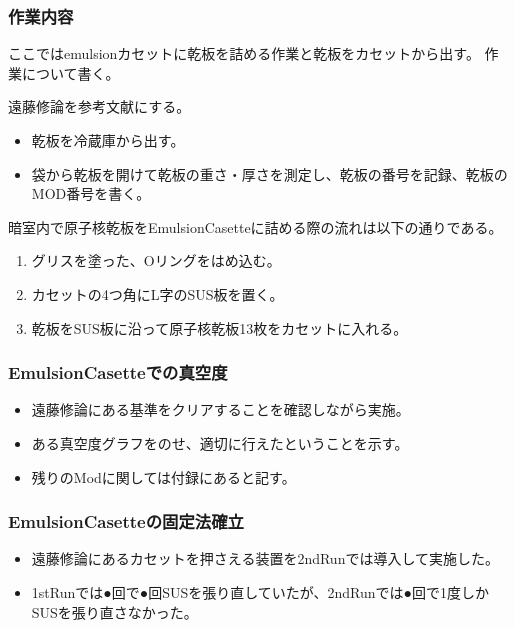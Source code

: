 \documentclass[12pt,a4paper]{jarticle}
\begin{document}
\subsubsection{作業内容}
ここではemulsionカセットに乾板を詰める作業と乾板をカセットから出す。
作業について書く。
\par
遠藤修論を参考文献にする。
\begin{itemize}
 \item 乾板を冷蔵庫から出す。
 \item 袋から乾板を開けて乾板の重さ・厚さを測定し、乾板の番号を記録、乾板のMOD番号を書く。
\end{itemize}
暗室内で原子核乾板をEmulsionCasetteに詰める際の流れは以下の通りである。
\begin{enumerate}
    \item グリスを塗った、Oリングをはめ込む。
    \item カセットの4つ角にL字のSUS板を置く。 
    \item 乾板をSUS板に沿って原子核乾板13枚をカセットに入れる。
\end{enumerate}
\subsubsection{EmulsionCasetteでの真空度}
\begin{itemize}
 \item 遠藤修論にある基準をクリアすることを確認しながら実施。
 \item ある真空度グラフをのせ、適切に行えたということを示す。
 \item 残りのModに関しては付録にあると記す。
\end{itemize}
\subsubsection{EmulsionCasetteの固定法確立}
\begin{itemize}
 \item 遠藤修論にあるカセットを押さえる装置を2ndRunでは導入して実施した。
 \item 1stRunでは●回で●回SUSを張り直していたが、2ndRunでは●回で1度しかSUSを張り直さなかった。
\end{itemize}
\end{document}
